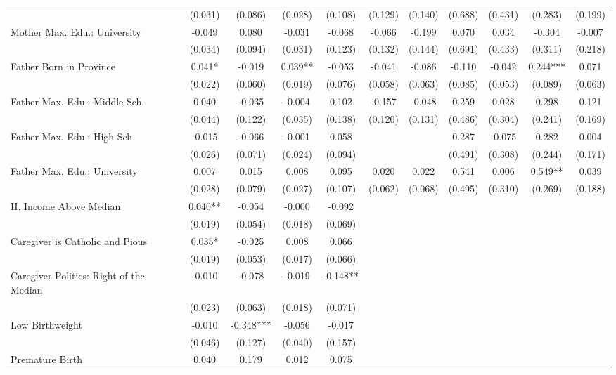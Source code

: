 \begin{tabular}{lcccccccccc}
 & (0.031) & (0.086) & (0.028) & (0.108) & (0.129) & (0.140) & (0.688) & (0.431) & (0.283) & (0.199) \\
Mother Max. Edu.: University & -0.049 & 0.080 & -0.031 & -0.068 & -0.066 & -0.199 & 0.070 & 0.034 & -0.304 & -0.007 \\
 & (0.034) & (0.094) & (0.031) & (0.123) & (0.132) & (0.144) & (0.691) & (0.433) & (0.311) & (0.218) \\
Father Born in Province & 0.041* & -0.019 & 0.039** & -0.053 & -0.041 & -0.086 & -0.110 & -0.042 & 0.244*** & 0.071 \\
 & (0.022) & (0.060) & (0.019) & (0.076) & (0.058) & (0.063) & (0.085) & (0.053) & (0.089) & (0.063) \\
Father Max. Edu.: Middle Sch. & 0.040 & -0.035 & -0.004 & 0.102 & -0.157 & -0.048 & 0.259 & 0.028 & 0.298 & 0.121 \\
 & (0.044) & (0.122) & (0.035) & (0.138) & (0.120) & (0.131) & (0.486) & (0.304) & (0.241) & (0.169) \\
Father Max. Edu.: High Sch. & -0.015 & -0.066 & -0.001 & 0.058 &  &  & 0.287 & -0.075 & 0.282 & 0.004 \\
 & (0.026) & (0.071) & (0.024) & (0.094) &  &  & (0.491) & (0.308) & (0.244) & (0.171) \\
Father Max. Edu.: University & 0.007 & 0.015 & 0.008 & 0.095 & 0.020 & 0.022 & 0.541 & 0.006 & 0.549** & 0.039 \\
 & (0.028) & (0.079) & (0.027) & (0.107) & (0.062) & (0.068) & (0.495) & (0.310) & (0.269) & (0.188) \\
H. Income Above Median & 0.040** & -0.054 & -0.000 & -0.092 &  &  &  &  &  &  \\
 & (0.019) & (0.054) & (0.018) & (0.069) &  &  &  &  &  &  \\
Caregiver is Catholic and Pious & 0.035* & -0.025 & 0.008 & 0.066 &  &  &  &  &  &  \\
 & (0.019) & (0.053) & (0.017) & (0.066) &  &  &  &  &  &  \\
Caregiver Politics: Right of the Median & -0.010 & -0.078 & -0.019 & -0.148** &  &  &  &  &  &  \\
 & (0.023) & (0.063) & (0.018) & (0.071) &  &  &  &  &  &  \\
Low Birthweight & -0.010 & -0.348*** & -0.056 & -0.017 &  &  &  &  &  &  \\
 & (0.046) & (0.127) & (0.040) & (0.157) &  &  &  &  &  &  \\
Premature Birth & 0.040 & 0.179 & 0.012 & 0.075 &  &  &  &  &  &  \\

\end{tabular}
